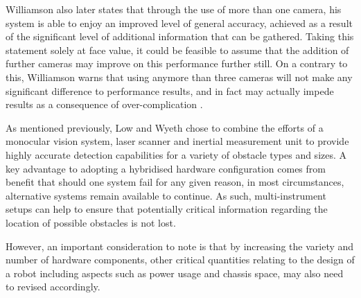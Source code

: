 Williamson also later states that through the use of more than one camera, his system is able to enjoy an improved level of general accuracy, achieved as a result of the significant level of additional information that can be gathered. Taking this statement solely at face value, it could be feasible to assume that the addition of further cameras may improve on this performance further still. On a contrary to this, Williamson warns that using anymore than three cameras will not make any significant difference to performance results, and in fact may actually impede results as a consequence of over-complication \cite{williamson}.

As mentioned previously, Low and Wyeth \cite{wyeth} chose to combine the efforts of a monocular vision system, laser scanner and inertial measurement unit to provide highly accurate detection capabilities for a variety of obstacle types and sizes. A key advantage to adopting a hybridised hardware configuration comes from benefit that should one system fail for any given reason, in most circumstances, alternative systems remain available to continue. As such, multi-instrument setups can help to ensure that potentially critical information regarding the location of possible obstacles is not lost. 

However, an important consideration to note is that by increasing the variety and number of hardware components, other critical quantities relating to the design of a robot including aspects such as power usage and chassis space, may also need to revised accordingly.

%
% 
%
%
%

